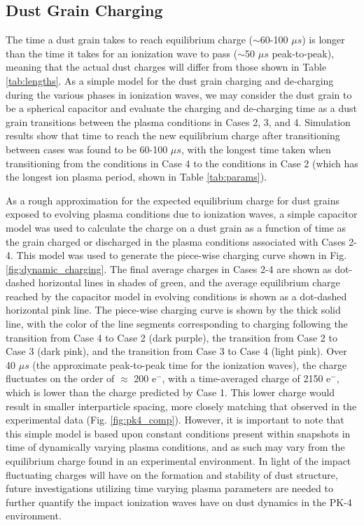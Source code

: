 \documentclass[aip,amsmath,amssymb,graphicx,floatfix,reprint]{revtex4-1}
\begin{document}
\subsection{Dust Grain Charging}
\label{graincharge}
The time a dust grain takes to reach equilibrium charge ($\sim$60-100 $\mu s$) is longer than the time it takes for an ionization wave to pass ($\sim$50 $\mu s$ peak-to-peak), meaning that the actual dust charges will differ from those shown in Table \ref{tab:lengths}.  As a simple model for the dust grain charging and de-charging during the various phases in ionization waves, we may consider the dust grain to be a spherical capacitor and evaluate the charging and de-charging time as a dust grain transitions between the plasma conditions in Cases 2, 3, and 4.  Simulation results show that time to reach the new equilibrium charge after transitioning between cases was found to be 60-100 $\mu s$, with the longest time taken when transitioning from the conditions in Case 4 to the conditions in Case 2 (which has the longest ion plasma period, shown in Table \ref{tab:params}).

As a rough approximation for the expected equilibrium charge for dust grains exposed to evolving plasma conditions due to ionization waves, a simple capacitor model was used to calculate the charge on a dust grain as a function of time as the grain charged or discharged in the plasma conditions associated with Cases 2-4.  This model was used to generate the piece-wise charging curve shown in Fig. \ref{fig:dynamic_charging}.  The final average charges in Cases 2-4 are shown as dot-dashed horizontal lines in shades of green, and the average equilibrium charge reached by the capacitor model in evolving conditions is shown as a dot-dashed horizontal pink line.  The piece-wise charging curve is shown by the thick solid line, with the color of the line segments corresponding to charging following the transition from Case 4 to Case 2 (dark purple), the transition from Case 2 to Case 3 (dark pink), and the transition from Case 3 to Case 4 (light pink).  Over 40 $\mu s$ (the approximate peak-to-peak time for the ionization waves), the charge fluctuates on the order of $\approx$ 200 e$^{-}$, with a time-averaged charge of 2150 e$^{-}$, which is lower than the charge predicted by Case 1.  This lower charge would result in smaller interparticle spacing, more closely matching that observed in the experimental data (Fig. \ref{fig:pk4_comp}).  However, it is important to note that this simple model is based upon constant conditions present within snapshots in time of dynamically varying plasma conditions, and as such may vary from the equilibrium charge found in an experimental environment.  In light of the impact fluctuating charges will have on the formation and stability of dust structure, future investigations utilizing time varying plasma parameters are needed to further quantify the impact ionization waves have on dust dynamics in the PK-4 environment.
\end{document}
